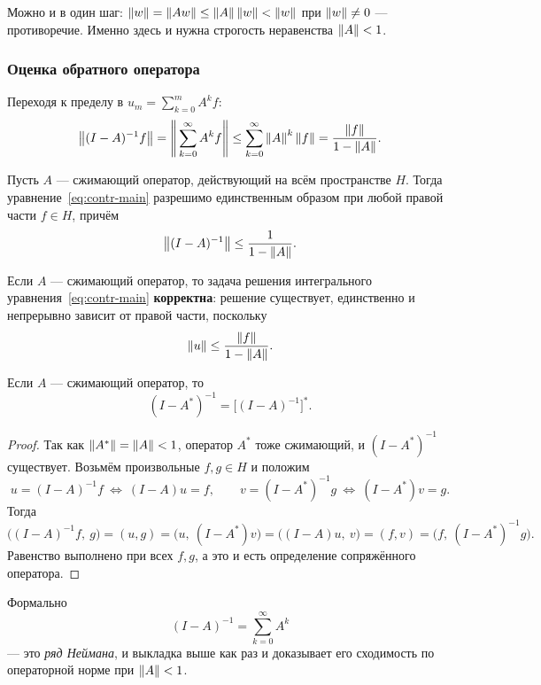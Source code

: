 \begin{idea}
Можно и в один шаг: $\left\lVert w \right\rVert = \left\lVert Aw \right\rVert \le \left\lVert A \right\rVert\left\lVert w \right\rVert < \left\lVert w \right\rVert$
при $\left\lVert w \right\rVert \ne 0$ — противоречие. Именно здесь и нужна строгость
неравенства $\left\lVert A \right\rVert < 1$.
\end{idea}

\subsubsection*{Оценка обратного оператора}

Переходя к пределу в $u_m = \sum_{k=0}^m A^k f$:
\[
  \left\lVert (I-A)^{-1} f \right\rVert
  = \Bigg\|\sum_{k=0}^{\infty} A^k f\Bigg\|
  \le \sum_{k=0}^{\infty} \left\lVert A \right\rVert^k \left\lVert f \right\rVert
  = \frac{\left\lVert f \right\rVert}{1 - \left\lVert A \right\rVert} .
\]

\begin{proposition}\label{prop:contraction}
Пусть $A$ — сжимающий оператор, действующий на всём пространстве $H$. Тогда
уравнение~\eqref{eq:contr-main} разрешимо единственным образом при любой
правой части $f \in H$, причём
\[
  \left\lVert (I - A)^{-1} \right\rVert \le \frac{1}{1 - \left\lVert A \right\rVert} .
\]
\end{proposition}

\begin{corollary}
Если $A$ — сжимающий оператор, то задача решения интегрального
уравнения~\eqref{eq:contr-main} \textbf{корректна}: решение существует,
единственно и непрерывно зависит от правой части, поскольку
\[
  \left\lVert u \right\rVert \le \frac{\left\lVert f \right\rVert}{1 - \left\lVert A \right\rVert} .
\]
\end{corollary}

\begin{corollary}\label{cor:adj-inverse}
Если $A$ — сжимающий оператор, то
\[
  (I - A^*)^{-1} = \big[(I - A)^{-1}\big]^{*} .
\]
\end{corollary}

\begin{proof}
Так как $\left\lVert A^* \right\rVert = \left\lVert A \right\rVert < 1$, оператор $A^*$ тоже сжимающий, и
$(I - A^*)^{-1}$ существует. Возьмём произвольные $f, g \in H$ и положим
\[
  u = (I-A)^{-1} f \ \Longleftrightarrow\ (I-A)u = f ,
  \qquad
  v = (I-A^*)^{-1} g \ \Longleftrightarrow\ (I-A^*)v = g .
\]
Тогда
\[
  \big((I-A)^{-1} f,\ g\big)
  = (u, g)
  = \big(u,\ (I-A^*)v\big)
  = \big((I-A)u,\ v\big)
  = (f, v)
  = \big(f,\ (I-A^*)^{-1} g\big) .
\]
Равенство выполнено при всех $f, g$, а это и есть определение сопряжённого
оператора.
\end{proof}

\begin{remark}
Формально
\[
  (I - A)^{-1} = \sum_{k=0}^{\infty} A^k
\]
— это \emph{ряд Неймана}, и выкладка выше как раз и доказывает его сходимость
по операторной норме при $\left\lVert A \right\rVert < 1$.
\end{remark}

